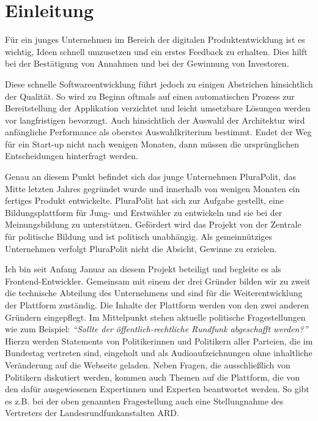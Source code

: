 \section{Einleitung}

Für ein junges Unternehmen im Bereich der digitalen Produktentwicklung ist es wichtig, Ideen schnell umzusetzen und ein erstes Feedback zu erhalten. Dies hilft bei der Bestätigung von Annahmen und bei der Gewinnung von Investoren.

Diese schnelle Softwareentwicklung führt jedoch zu einigen Abstrichen hinsichtlich der Qualität. So wird zu Beginn oftmals auf einen automatischen Prozess zur Bereitstellung der Applikation verzichtet und leicht umsetzbare Lösungen werden vor langfristigen bevorzugt. Auch hinsichtlich der Auswahl der Architektur wird anfängliche Performance als oberstes Auswahlkriterium bestimmt. Endet der Weg für ein Start-up nicht nach wenigen Monaten, dann müssen die ursprünglichen Entscheidungen hinterfragt werden.

Genau an diesem Punkt befindet sich das junge Unternehmen PluraPolit, das Mitte letzten Jahres gegründet wurde und innerhalb von wenigen Monaten ein fertiges Produkt entwickelte. PluraPolit hat sich zur Aufgabe gestellt, eine Bildungsplattform für Jung- und Erstwähler zu entwickeln und sie bei der Meinungsbildung zu unterstützen. Gefördert wird das Projekt von der Zentrale für politische Bildung und ist politisch unabhängig. Als gemeinnütziges Unternehmen verfolgt PluraPolit nicht die Absicht, Gewinne zu erzielen.

Ich bin seit Anfang Januar an diesem Projekt beteiligt und begleite es als Frontend-Entwickler. Gemeinsam mit einem der drei Gründer bilden wir zu zweit die technische Abteilung des Unternehmens und sind für die Weiterentwicklung der Plattform zuständig. Die Inhalte der Plattform werden von den zwei anderen Gründern eingepflegt. Im Mittelpunkt stehen aktuelle politische Fragestellungen wie zum Beispiel: \textit{\enquote{Sollte der öffentlich-rechtliche Rundfunk abgeschafft werden?}} Hierzu werden Statements von Politikerinnen und Politikern aller Parteien, die im Bundestag vertreten sind, eingeholt und als Audioaufzeichnungen ohne inhaltliche Veränderung auf die Webseite geladen. Neben Fragen, die ausschließlich von Politikern diskutiert werden, kommen auch Themen auf die Plattform, die von den dafür ausgewiesenen Expertinnen und Experten beantwortet werden. So gibt es z.B. bei der oben genannten Fragestellung auch eine Stellungnahme des Vertreters der Landesrundfunkanstalten ARD. 

